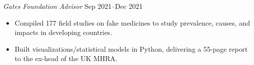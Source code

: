 \textit{Gates Foundation Advisor} \hfill Sep 2021--Dec 2021
\begin{itemize}
	\item Compiled 177 field studies on fake medicines to study prevalence, causes, and impacts in developing countries.
	\item Built visualizations/statistical models in Python, delivering a 55-page report to the ex-head of the UK MHRA.
\end{itemize}\par